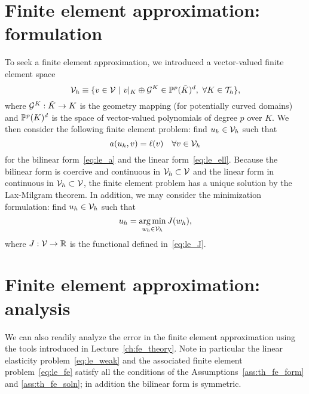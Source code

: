 \section{Finite element approximation: formulation}
To seek a finite element approximation, we introduced a vector-valued finite element space
\begin{equation*}
  \mathcal{V}_h \equiv \{ v \in \mathcal{V} \ | \ v|_K \oplus \mathcal{G}^K \in \mathbb{P}^p(\tilde K)^d, \ \forall K \in \mathcal{T}_h \},
\end{equation*}
where $\mathcal{G}^K: \tilde K \to K$ is the geometry mapping (for potentially curved domains) and $\mathbb{P}^p(K)^d$ is the space of vector-valued polynomials of degree $p$ over $K$. We then consider the following finite element problem: find $u_h \in \mathcal{V}_h$ such that
\begin{equation}
  a(u_h,v) = \ell(v) \quad \forall v \in \mathcal{V}_h
  \label{eq:le_fe}
\end{equation}
for the bilinear form~\eqref{eq:le_a} and the linear form~\eqref{eq:le_ell}. Because the bilinear form is coercive and continuous in $\mathcal{V}_h \subset \mathcal{V}$ and the linear form in continuous in $\mathcal{V}_h \subset \mathcal{V}$, the finite element problem has a unique solution by the Lax-Milgram theorem. In addition, we may consider the minimization formulation: find $u_h \in \mathcal{V}_h$ such that
\begin{equation*}
  u_h = \operatorname*{arg\,min}_{w_h \in \mathcal{V}_h} J(w_h),
\end{equation*}
where $J: \mathcal{V} \to \mathbb{R}$ is the functional defined in~\eqref{eq:le_J}.


\section{Finite element approximation: analysis}

We can also readily analyze the error in the finite element approximation using the tools introduced in Lecture~\ref{ch:fe_theory}. Note in particular the linear elasticity problem~\eqref{eq:le_weak} and the associated finite element problem~\eqref{eq:le_fe} satisfy all the conditions of the Assumptions~\ref{ass:th_fe_form} and \ref{ass:th_fe_soln}; in addition the bilinear form is symmetric.

